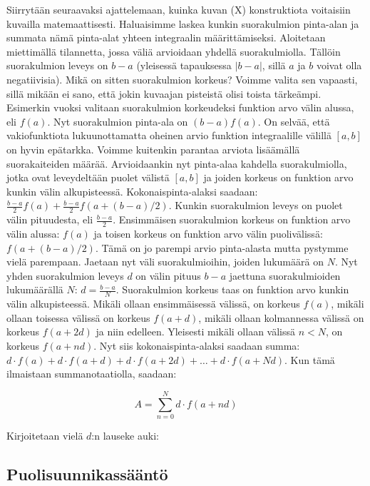 \documentclass[../integrointiopas.tex]{subfiles}
\begin{document}
    Siirrytään seuraavaksi ajattelemaan, kuinka kuvan (X) konstruktiota voitaisiin kuvailla matemaattisesti. Haluaisimme laskea kunkin suorakulmion pinta-alan ja summata
    nämä pinta-alat yhteen integraalin määrittämiseksi. Aloitetaan miettimällä tilannetta, jossa väliä arvioidaan yhdellä suorakulmiolla. Tällöin suorakulmion leveys on
    $b-a$ (yleisessä tapauksessa $|b-a|$, sillä $a$ ja $b$ voivat olla negatiivisia). Mikä on sitten suorakulmion korkeus? Voimme valita sen vapaasti, sillä mikään ei
    sano, että jokin kuvaajan pisteistä olisi toista tärkeämpi. Esimerkin vuoksi valitaan suorakulmion korkeudeksi funktion arvo välin alussa, eli $f(a)$. Nyt suorakulmion
    pinta-ala on $(b-a)f(a)$. On selvää, että vakiofunktiota lukuunottamatta oheinen arvio funktion integraalille välillä $[a,b]$ on hyvin epätarkka. Voimme kuitenkin parantaa
    arviota lisäämällä suorakaiteiden määrää. Arvioidaankin nyt pinta-alaa kahdella suorakulmiolla, jotka ovat leveydeltään puolet välistä $[a,b]$ ja joiden korkeus on funktion
    arvo kunkin välin alkupisteessä. Kokonaispinta-alaksi saadaan: $\frac{b-a}{2}f(a) + \frac{b-a}{2}f(a+(b-a)/2)$. Kunkin suorakulmion leveys on puolet välin pituudesta, eli
    $\frac{b-a}{2}$. Ensimmäisen suorakulmion korkeus on funktion arvo välin alussa: $f(a)$ ja toisen korkeus on funktion arvo välin puolivälissä: $f(a+(b-a)/2)$. Tämä on jo
    parempi arvio pinta-alasta mutta pystymme vielä parempaan. Jaetaan nyt väli suorakulmioihin, joiden lukumäärä on $N$. Nyt yhden suorakulmion leveys $d$ on välin pituus $b-a$ jaettuna
    suorakulmioiden lukumäärällä $N$: $d = \frac{b - a}{N}$. Suorakulmion korkeus taas on funktion arvo kunkin välin alkupisteessä. Mikäli ollaan ensimmäisessä välissä, on korkeus $f(a)$,
    mikäli ollaan toisessa välissä on korkeus $f(a + d)$, mikäli ollaan kolmannessa välissä on korkeus $f(a + 2d)$ ja niin edelleen. Yleisesti mikäli ollaan välissä $n < N$, on korkeus $f(a + nd)$.
    Nyt siis kokonaispinta-alaksi saadaan summa: $d\cdot f(a) + d\cdot f(a + d) + d\cdot f(a + 2d) + \dots + d \cdot f(a + Nd)$. Kun tämä ilmaistaan summanotaatiolla, saadaan:

    \begin{equation*}
        A = \sum_{n = 0}^{N}d\cdot f(a + nd)
    \end{equation*}

    Kirjoitetaan vielä $d$:n lauseke auki:

	
	\subsection{Puolisuunnikassääntö}
	
\end{document}
